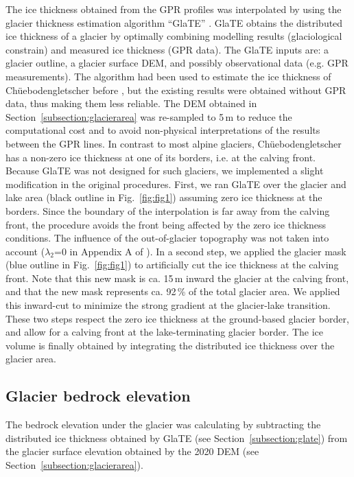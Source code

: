 The ice thickness obtained from the GPR profiles was interpolated by using the glacier thickness estimation algorithm ``GlaTE'' \citep{Langhammer&al2019}. GlaTE obtains the distributed ice thickness of a glacier by optimally combining modelling results (glaciological constrain) and measured ice thickness (GPR data). The GlaTE inputs are: a glacier outline, a glacier surface DEM, and possibly observational data (e.g. GPR measurements). The algorithm had been used to estimate the ice thickness of Chüebodengletscher before \citep{Grab&al2021}, but the existing results were obtained without GPR data, thus making them less reliable. The DEM obtained in Section~\ref{subsection:glacierarea} was re-sampled to 5\,m to reduce the computational cost and to avoid non-physical interpretations of the results between the GPR lines. In contrast to most alpine glaciers, Chüebodengletscher has a non-zero ice thickness at one of its borders, i.e. at the calving front. Because GlaTE was not designed for such glaciers, we implemented a slight modification in the original procedures. First, we ran GlaTE over the glacier and lake area (black outline in Fig.~\ref{fig:fig1}) assuming zero ice thickness at the borders. Since the boundary of the interpolation is far away from the calving front, the procedure avoids the front being affected by the zero ice thickness conditions. The influence of the out-of-glacier topography was not taken into account ($\lambda_2$=0 in Appendix A of \cite{Grab&al2021}). In a second step, we applied the glacier mask (blue outline in Fig.~\ref{fig:fig1}) to artificially cut the ice thickness at the calving front. Note that this new mask is ca. 15\,m inward the glacier at the calving front, and that the new mask represents ca. 92\,\% of the total glacier area. We applied this inward-cut to minimize the strong gradient at the glacier-lake transition. These two steps respect the zero ice thickness at the ground-based glacier border, and allow for a calving front at the lake-terminating glacier border. The ice volume is finally obtained by integrating the distributed ice thickness over the glacier area.  


\subsection{Glacier bedrock elevation}
\label{subsection:bedrock}

The bedrock elevation under the glacier was calculating by subtracting the distributed ice thickness obtained by GlaTE (see Section~\ref{subsection:glate}) from the glacier surface elevation obtained by the 2020 DEM (see Section~\ref{subsection:glacierarea}). 


